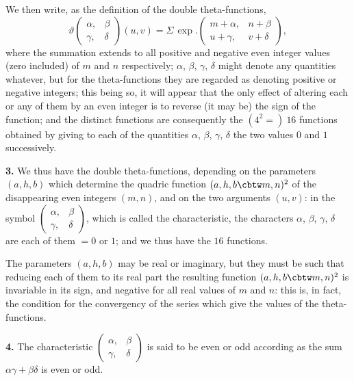 \documentclass[11pt,a4paper]{book}
\begin{document}
We then write, as the definition of the double theta-functions,
\[
\vartheta\begin{pmatrix} \alpha, & \beta \\ \gamma, & \delta \end{pmatrix}(u, v) = \Sigma\, \exp.\begin{pmatrix} m + \alpha, & n + \beta \\ u + \gamma, & v + \delta \end{pmatrix},
\]
where the summation extends to all positive and negative even integer values (zero included) of $m$ and $n$ respectively; $\alpha$, $\beta$, $\gamma$, $\delta$ might denote any quantities whatever, but for the theta-functions they are regarded as denoting positive or negative integers; this being so, it will appear that the only effect of altering each or any of them by an even integer is to reverse (it may be) the sign of the function; and the distinct functions are consequently the $(4^2 =)\ 16$ functions obtained by giving to each of the quantities $\alpha$, $\beta$, $\gamma$, $\delta$ the two values $0$ and $1$ successively.

\noindent\textbf{3.}\quad
We thus have the double theta-functions, depending on the parameters $(a, h, b)$ which determine the quadric function $(a, h, b\cbtw m, n)^2$ of the disappearing even integers $(m, n)$, and on the two arguments $(u, v)$: in the symbol $\begin{pmatrix} \alpha, & \beta \\ \gamma, & \delta \end{pmatrix}$, which is called the characteristic, the characters $\alpha$, $\beta$, $\gamma$, $\delta$ are each of them $= 0$ or $1$; and we thus have the $16$ functions.

The parameters $(a, h, b)$ may be real or imaginary, but they must be such that reducing each of them to its real part the resulting function $(a, h, b\cbtw m, n)^2$ is invariable in its sign, and negative for all real values of $m$ and $n$: this is, in fact, the condition for the convergency of the series which give the values of the theta-functions.

\noindent\textbf{4.}\quad
The characteristic $\begin{pmatrix} \alpha, & \beta \\ \gamma, & \delta \end{pmatrix}$ is said to be even or odd according as the sum $\alpha\gamma + \beta\delta$ is even or odd.

\vspace{1em}
\end{document}
